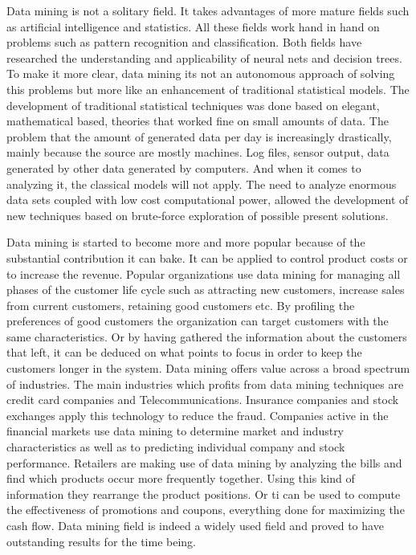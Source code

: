 Data mining is not a solitary field. It takes advantages of more mature fields such as artificial intelligence and statistics. All these fields work hand in hand on problems such as pattern recognition and classification. Both fields have researched the understanding and applicability of neural nets and decision trees. To make it more clear, data mining its not an autonomous approach of solving this problems but more like an enhancement of traditional statistical models. The development of traditional statistical techniques was done based on elegant, mathematical based, theories that worked fine on small amounts of data. The problem that the amount of generated data per day is increasingly drastically, mainly because the source are mostly machines. Log files, sensor output, data generated by other data generated by computers. And when it comes to analyzing it, the classical models will not apply. The need to analyze enormous data sets coupled with low cost computational power, allowed the development of new techniques based on brute-force exploration of possible present solutions.

Data mining is started to become more and more popular because of the substantial contribution it can bake. It can be applied to control product costs or to increase the revenue. Popular organizations use data mining for managing all phases of the customer life cycle such as attracting new customers, increase sales from current customers, retaining good customers etc.
By profiling the preferences of good customers the organization can target customers with the same characteristics. Or by having gathered the information about the customers that left, it can be deduced on what points to focus in order to keep the customers longer in the system. Data mining offers value across a broad spectrum of industries. The main industries which profits from data mining techniques are credit card companies and Telecommunications. Insurance companies and stock exchanges apply this technology to reduce the fraud. Companies active in the financial markets use data mining to determine market and industry characteristics as well as to predicting individual company and stock performance. Retailers are making use of data mining by analyzing the bills and find which products occur more frequently together. Using this kind of information they rearrange the product positions. Or ti can be used to compute the effectiveness of promotions and coupons, everything done for maximizing the cash flow. Data mining field is indeed a widely used field and proved to have outstanding results for the time being.

